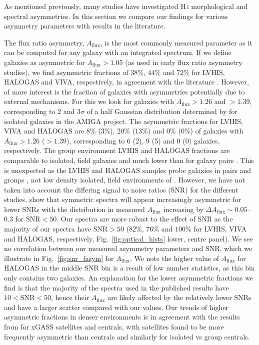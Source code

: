 \documentclass[fleqn,usenatbib]{mnras}
\begin{document}
As mentioned previously, many studies have investigated H\,\textsc{i} morphological and spectral asymmetries. In this section we compare our findings for various asymmetry parameters with results in the literature. 

The flux ratio asymmetry, $A_{\mathrm{flux}}$, is the most commonly measured parameter as it can be computed for any galaxy with an integrated spectrum. If we define galaxies as asymmetric for $A_{\mathrm{flux}}>1.05$ (as used in early flux ratio asymmetry studies), we find asymmetric fractions of $38\%$, $44\%$ and $72\%$ for LVHIS, HALOGAS and VIVA, respectively, in agreement with the literature \citep[e.g. $45\%$, $77\%$ and $50\%$ in][respectively]{Richter1994,Matthews1998,Haynes1998}. However, of more interest is the fraction of galaxies with asymmetries potentially due to external mechanisms. For this we look for galaxies with $A_{\mathrm{flux}}>1.26$ and $>1.39$, corresponding to 2 and $3\sigma$ of a half Gaussian distribution determined by \cite{Espada2011} for isolated galaxies in the AMIGA project. The asymmetric fractions for LVHIS, VIVA and HALOGAS are $8\%$ ($3\%$), $20\%$ ($13\%$) and $0\%$ ($0\%$) of galaxies with $A_{\mathrm{flux}}>1.26$ ($>1.39$), corresponding to 6 (2), 9 (5) and 0 (0) galaxies, respectively. The group environment LVHIS and HALOGAS fractions are comparable to isolated, field galaxies \citep[$2\%$,][]{Espada2011} and much lower than for galaxy pairs \citep[$27\%$,][]{Bok2018}. This is unexpected as the LVHIS and HALOGAS samples probe galaxies in pairs and groups \citep[i.e.\ similar environments to those probed by][]{Bok2018}, not low density isolated, field environments of \cite{Espada2011}. However, we have not taken into account the differing signal to noise ratios (SNR) for the different studies. \cite{Watts2020} show that symmetric spectra will appear increasingly asymmetric for lower SNRs with the distribution in measured $A_{\mathrm{flux}}$ increasing by $\Delta A_{\mathrm{flux}}\sim0.05$--0.3 for $\mathrm{SNR}<50$. Our spectra are more robust to the effect of SNR as the majority of our spectra have $\mathrm{SNR}>50$ ($82\%$, $76\%$ and $100\%$ for LVHIS, VIVA and HALOGAS, respectively, Fig.~\ref{fig:optical_hists} lower, centre panel). We see no correlation between our measured asymmetry parameters and SNR, which we illustrate in Fig.~\ref{fig:snr_fasym} for $A_{\mathrm{flux}}$. We note the higher value of $A_{\mathrm{flux}}$ for HALOGAS in the middle SNR bin is a result of low number statistics, as this bin only contains two galaxies. An explanation for the lower asymmetric fractions we find is that the majority of the spectra used in the published results have $10<\mathrm{SNR}<50$, hence their $A_{\mathrm{flux}}$ are likely affected by the relatively lower SNRs and have a larger scatter compared with our values. Our trends of higher asymmetric fractions in denser environments is in agreement with the results from \cite{Watts2020} for xGASS satellites and centrals, with satellites found to be more frequently asymmetric than centrals and similarly for isolated vs group centrals.
\end{document}
